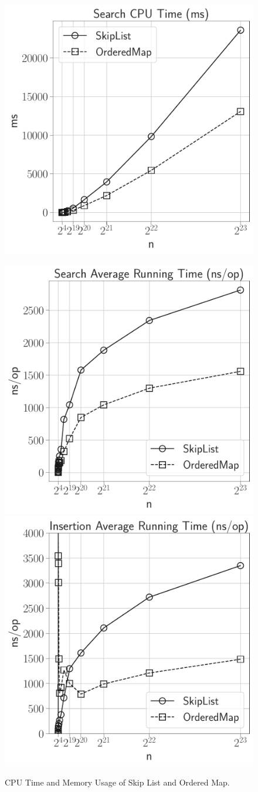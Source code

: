 \documentclass[12pt]{article}
\begin{document}
\begin{figure}[H]
\begin{minipage}{0.32\textwidth}
	\end{minipage}\hfill\
	\begin{minipage}{0.32\textwidth}
		\centering
		\includegraphics[width=\linewidth]{../notebook/plot/sl_search_cpu_time_(ms).pdf}
	\end{minipage}\hfill
	\vspace{10pt}
	\begin{minipage}{1\textwidth}
		\centering
		\includegraphics[width=.32\linewidth]{../notebook/plot/sl_search_average_running_time_(ns_op).pdf}
		\includegraphics[width=.32\linewidth]{../notebook/plot/sl_insertion_average_running_time_(ns_op).pdf}
	\end{minipage}\hfill

	\caption{CPU Time and Memory Usage of Skip List and Ordered Map.}
	\label{fig:sl_vs_om}
\end{figure}
\end{document}

